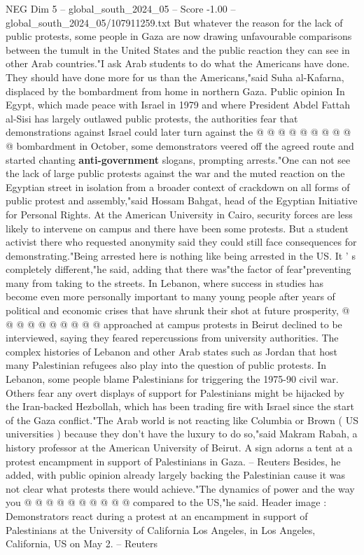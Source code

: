 \begin{textsample}{NEG Dim 5 – global\_south\_2024\_05 – Score -1.00 – global\_south\_2024\_05/107911259.txt}
But whatever the reason for the lack of public protests, some people in Gaza are now drawing unfavourable comparisons between the tumult in the United States and the public reaction they can see in other Arab countries."I ask Arab students to do what the Americans have done.
They should have done more for us than the Americans,"said Suha al-Kafarna, displaced by the bombardment from home in northern Gaza.
Public opinion In Egypt, which made peace with Israel in 1979 and where President Abdel Fattah al-Sisi has largely outlawed public protests, the authorities fear that demonstrations against Israel could later turn against the @ @ @ @ @ @ @ @ @ @ bombardment in October, some demonstrators veered off the agreed route and started chanting \textbf{anti-government} slogans, prompting arrests."One can not see the lack of large public protests against the war and the muted reaction on the Egyptian street in isolation from a broader context of crackdown on all forms of public protest and assembly,"said Hossam Bahgat, head of the Egyptian Initiative for Personal Rights.
At the American University in Cairo, security forces are less likely to intervene on campus and there have been some protests.
But a student activist there who requested anonymity said they could still face consequences for demonstrating."Being arrested here is nothing like being arrested in the US.
It ' s completely different,"he said, adding that there was"the factor of fear"preventing many from taking to the streets.
In Lebanon, where success in studies has become even more personally important to many young people after years of political and economic crises that have shrunk their shot at future prosperity, @ @ @ @ @ @ @ @ @ @ approached at campus protests in Beirut declined to be interviewed, saying they feared repercussions from university authorities.
The complex histories of Lebanon and other Arab states such as Jordan that host many Palestinian refugees also play into the question of public protests.
In Lebanon, some people blame Palestinians for triggering the 1975-90 civil war.
Others fear any overt displays of support for Palestinians might be hijacked by the Iran-backed Hezbollah, which has been trading fire with Israel since the start of the Gaza conflict."The Arab world is not reacting like Columbia or Brown ( US universities ) because they don't have the luxury to do so,"said Makram Rabah, a history professor at the American University of Beirut.
A sign adorns a tent at a protest encampment in support of Palestinians in Gaza. -- Reuters Besides, he added, with public opinion already largely backing the Palestinian cause it was not clear what protests there would achieve."The dynamics of power and the way you @ @ @ @ @ @ @ @ @ @ compared to the US,"he said.
Header image : Demonstrators react during a protest at an encampment in support of Palestinians at the University of California Los Angeles, in Los Angeles, California, US on May 2. -- Reuters

\end{textsample}

